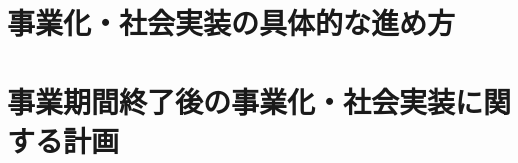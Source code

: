 \documentclass[uplatex]{jsarticle}
\begin{document}

\section{事業化・社会実装の具体的な進め方}


\section{事業期間終了後の事業化・社会実装に関する計画}

\end{document}
